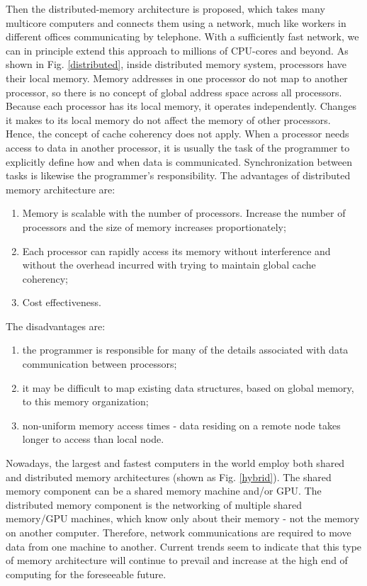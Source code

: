 Then the distributed-memory architecture is proposed, which takes many multicore computers and connects them using a network, much like workers in different offices communicating by telephone. With a sufficiently fast network, we can in principle extend this approach to millions of CPU-cores and beyond. As shown in Fig. \ref{distributed}, inside distributed memory system, processors have their local memory. Memory addresses in one processor do not map to another processor, so there is no concept of global address space across all processors. Because each processor has its local memory, it operates independently. Changes it makes to its local memory do not affect the memory of other processors. Hence, the concept of cache coherency does not apply. When a processor needs access to data in another processor, it is usually the task of the programmer to explicitly define how and when data is communicated. Synchronization between tasks is likewise the programmer's responsibility. The advantages of distributed memory architecture are: 
\begin{enumerate}
	\item Memory is scalable with the number of processors. Increase the number of processors and the size of memory increases proportionately; 
	\item Each processor can rapidly access its memory without interference and without the overhead incurred with trying to maintain global cache coherency;
	\item Cost effectiveness.
\end{enumerate}

The disadvantages are: 
\begin{enumerate}
	\item the programmer is responsible for many of the details associated with data communication between processors;
	\item it may be difficult to map existing data structures, based on global memory, to this memory organization;
	\item non-uniform memory access times - data residing on a remote node takes longer to access than local node.
\end{enumerate}

Nowadays, the largest and fastest computers in the world employ both shared and distributed memory architectures (shown as Fig. \ref{hybrid}). The shared memory component can be a shared memory machine and/or GPU. The distributed memory component is the networking of multiple shared memory/GPU machines, which know only about their memory - not the memory on another computer. Therefore, network communications are required to move data from one machine to another. Current trends seem to indicate that this type of memory architecture will continue to prevail and increase at the high end of computing for the foreseeable future.

